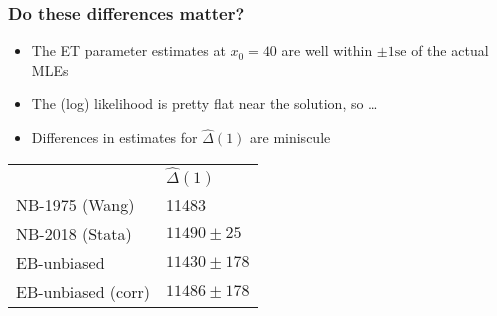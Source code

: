 \begin{frame}
	\frametitle{Do these differences matter?}
	\begin{itemize}
		\item The ET parameter estimates at $x_0=40$ are well within $\pm 1\mbox{se}$ of the actual MLEs
		\item The (log) likelihood is pretty flat near the solution, so \dots
		\item Differences in estimates for $\hat\Delta(1)$ are miniscule
	\end{itemize}
	
		\begin{table}
			\centering
			\begin{tabular}{ll}
				& $\hat\Delta(1)$\\[2mm]
				NB-1975 (Wang)     & 11483 \\
				NB-2018 (Stata)    & $11490 \pm 25$ \\[5mm]
				EB-unbiased        & $11430 \pm 178$ \\
				EB-unbiased (corr) & $11486 \pm 178$ \\[5mm]
			\end{tabular}
		\end{table}
\end{frame}
